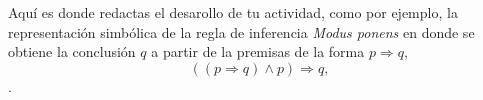 Aquí es donde redactas el desarollo de tu actividad, como por ejemplo, la representación simbólica de la regla de inferencia \textit{Modus ponens} en donde se obtiene la conclusión $q$ a partir de la premisas de la forma $p\Rightarrow q$,
\[
  \left(\left(p\Rightarrow q\right) \land p\right) \Rightarrow q,
\]
 \parencite[p.~19]{mipmunidad1}.
